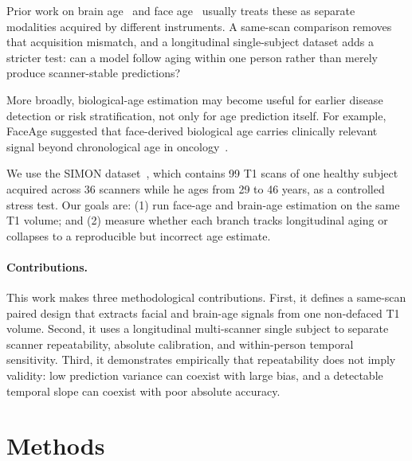\documentclass{midl} %
\begin{document}
Prior work on brain age~\citep{peng2021sfcn, puglisi2024synthba} and face
age~\citep{bontempi2025faceage} usually treats these as separate modalities
acquired by different instruments.  A same-scan comparison removes that
acquisition mismatch, and a longitudinal single-subject dataset adds a stricter
test: can a model follow aging within one person rather than merely produce
scanner-stable predictions?

More broadly, biological-age estimation may become useful for earlier disease
detection or risk stratification, not only for age prediction itself.  For
example, FaceAge suggested that face-derived biological age carries clinically
relevant signal beyond chronological age in oncology~\citep{bontempi2025faceage}.

We use the SIMON dataset~\citep{duchesne2019simon}, which contains 99 T1 scans of one
healthy subject acquired across 36 scanners while he ages from 29 to 46
years, as a controlled stress test.  Our goals are: (1) run face-age and
brain-age estimation on the same T1 volume; and (2) measure whether each
branch tracks longitudinal aging or collapses to a reproducible but incorrect
age estimate.

\paragraph{Contributions.}
This work makes three methodological contributions. First, it defines a
same-scan paired design that extracts facial and brain-age signals from one
non-defaced T1 volume. Second, it uses a longitudinal multi-scanner single
subject to separate scanner repeatability, absolute calibration, and
within-person temporal sensitivity. Third, it demonstrates empirically that
repeatability does not imply validity: low prediction variance can coexist
with large bias, and a detectable temporal slope can coexist with poor
absolute accuracy.

\section{Methods}
\end{document}
